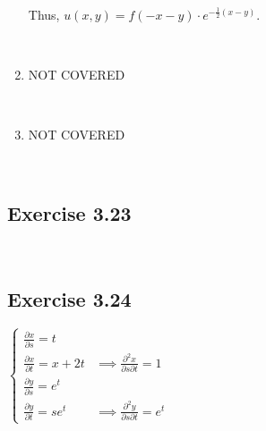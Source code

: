 \begin{enumerate}
    Thus, $u(x, y) = f(-x - y) \cdot e^{-\frac{1}{2}(x - y)}$. 

    {~~~}

    \item NOT COVERED
    
    {~~~}

    \item NOT COVERED
\end{enumerate}

{~~~}

\subsection*{Exercise 3.23}

{~~~}

\subsection*{Exercise 3.24}

$\begin{cases}
    \frac{\partial x}{\partial s} = t \\
    \frac{\partial x}{\partial t} = x + 2t & \implies \frac{\partial^2 x}{\partial s \partial t} = 1 \\
    \frac{\partial y}{\partial s} = e^t \\
    \frac{\partial y}{\partial t} = se^t & \implies \frac{\partial ^2y}{\partial s \partial t} = e^t
\end{cases}$

